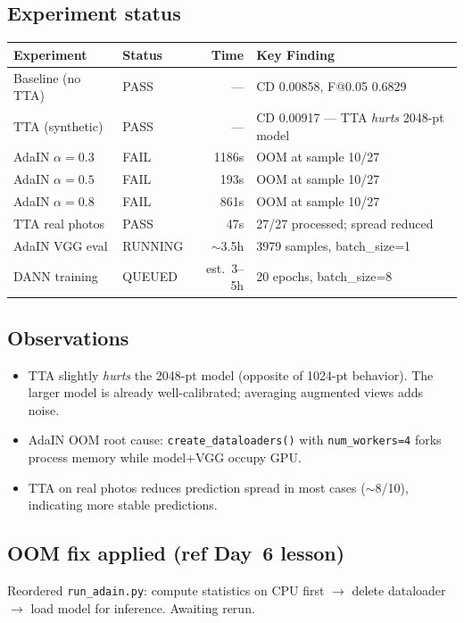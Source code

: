 \documentclass[10pt,a4paper]{article}
\begin{document}
\subsection*{Experiment status}

\begin{center}
\small
\begin{tabular}{llrl}
\toprule
\textbf{Experiment} & \textbf{Status} & \textbf{Time} & \textbf{Key Finding} \\
\midrule
Baseline (no TTA) & \textcolor{pass}{PASS} & --- & CD 0.00858, F@0.05 0.6829 \\
TTA (synthetic) & \textcolor{pass}{PASS} & --- & CD 0.00917 --- TTA \textit{hurts} 2048-pt model \\
AdaIN $\alpha\!=\!0.3$ & \textcolor{fail}{FAIL} & 1186s & OOM at sample 10/27 \\
AdaIN $\alpha\!=\!0.5$ & \textcolor{fail}{FAIL} & 193s & OOM at sample 10/27 \\
AdaIN $\alpha\!=\!0.8$ & \textcolor{fail}{FAIL} & 861s & OOM at sample 10/27 \\
TTA real photos & \textcolor{pass}{PASS} & 47s & 27/27 processed; spread reduced \\
AdaIN VGG eval & \textcolor{running}{RUNNING} & $\sim$3.5h & 3979 samples, batch\_size=1 \\
DANN training & \textcolor{queued}{QUEUED} & est.~3--5h & 20 epochs, batch\_size=8 \\
\bottomrule
\end{tabular}
\end{center}

\subsection*{Observations}
\begin{itemize}[nosep]
    \item TTA slightly \textit{hurts} the 2048-pt model (opposite of 1024-pt behavior). The larger model is already well-calibrated; averaging augmented views adds noise.
    \item AdaIN OOM root cause: \texttt{create\_dataloaders()} with \texttt{num\_workers=4} forks process memory while model+VGG occupy GPU.
    \item TTA on real photos reduces prediction spread in most cases ($\sim$8/10), indicating more stable predictions.
\end{itemize}

\subsection*{OOM fix applied (ref Day~6 lesson)}
Reordered \texttt{run\_adain.py}: compute statistics on CPU first $\to$ delete dataloader $\to$ load model for inference. Awaiting rerun.
\end{document}

